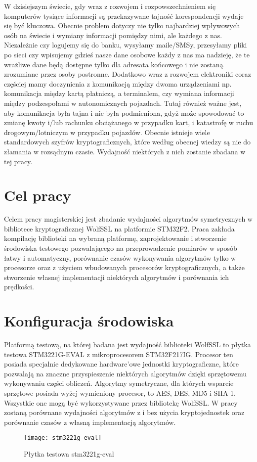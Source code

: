 \documentclass[oneside]{mgr}
\begin{document}
W dzisiejszym świecie, gdy wraz z rozwojem i rozpowszechnieniem się komputerów tysiące informacji są przekazywane tajność korespondencji wydaje się być kluczowa. Obecnie problem dotyczy nie tylko najbardziej wpływowych osób na świecie i wymiany informacji pomiędzy nimi, ale każdego z nas. Niezależnie czy logujemy się do banku, wysyłamy maile/SMSy, przesyłamy pliki po sieci czy wpisujemy gdzieś nasze dane osobowe każdy z nas ma nadzieję, że te wrażliwe dane będą dostępne tylko dla adresata końcowego i nie zostaną zrozumiane przez osoby postronne. Dodatkowo wraz z rozwojem elektroniki coraz częściej mamy doczynienia z komunikacją między dwoma urządzeniami np. komunikacja między kartą płatniczą, a terminalem, czy wymiana informacji między podzespołami w autonomicznych pojazdach. Tutaj również ważne jest, aby komunikacja była tajna i nie była podmieniona, gdyż może spowodować to zmianę kwoty i/lub rachunku obciążanego w przypadku kart, i katastrofę w ruchu drogowym/lotniczym w przypadku pojazdów. Obecnie istnieje wiele standardowych szyfrów kryptograficznych, które według obecnej wiedzy są nie do złamania w rozsądnym czasie. Wydajność niektórych z nich zostanie zbadana w tej pracy.

\chapter{Cel pracy}

Celem pracy magisterskiej jest zbadanie wydajności algorytmów symetrycznych w bibliotece kryptograficznej WolfSSL na platformie STM32F2. Praca zakłada kompilację biblioteki na wybraną platformę, zaprojektowanie i stworzenie środowiska testowego pozwalającego na  przeprowadzenie pomiarów w sposób łatwy i automatyczny, porównanie czasów wykonywania algorytmów tylko w procesorze oraz z użyciem wbudowanych procesorów kryptograficznych, a także stworzenie własnej implementacji niektórych algorytmów i porównania ich prędkości.
\chapter{Konfiguracja środowiska}

Platformą testową, na której badana jest wydajność biblioteki WolfSSL to płytka testowa STM3221G-EVAL z mikroprocesorem STM32F217IG. Procesor ten posiada specjalnie dedykowane hardware'owe jednostki kryptograficzne, które pozwalają na znaczne przyspieszenie niektórych algorytmów dzięki sprzętowemu wykonywaniu części obliczeń.  Algorytmy symetryczne, dla których wsparcie sprzętowe posiada wyżej wymieniony procesor, to AES, DES, MD5 i SHA-1. Wszystkie one mogą być wykorzystywane przez bibliotekę WolfSSL. W pracy zostaną porównane wydajności algorytmów z i bez użycia kryptojednostek oraz porównanie czasów z własną implementacją algorytmów.
\begin{center}
\begin{figure}[h]
\texttt{[image: stm3221g-eval]}
\caption{Płytka testowa stm3221g-eval}
\end{figure}

\end{center}
\end{document}
